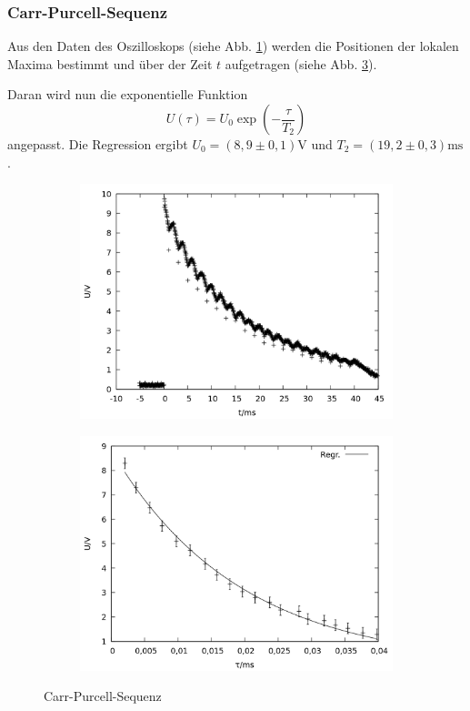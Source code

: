 \subsubsection{Carr-Purcell-Sequenz}
Aus den Daten des Oszilloskops (siehe Abb. \ref{fig:carr_raw}) werden die Positionen der lokalen Maxima bestimmt und über der Zeit $t$ aufgetragen (siehe Abb. \ref{fig:carr}).

Daran wird nun die exponentielle Funktion $$U(\tau) = U_0\exp{\left(-\frac{\tau}{T_2}\right)}$$ angepasst. Die Regression ergibt $U_0 = (8,9\pm 0,1)\si{\volt}$ und $T_2 = (19,2\pm 0,3) \si{\milli\second}$.\\

\begin{figure}[h]
  \begin{subfigure}[h]{0.5\textwidth}
    \centering
    \includegraphics[width=\linewidth]{data/p402_443_data/carr_purcell_sequenz/plot_156.png}
    \label{fig:carr_raw}
  \end{subfigure}%
  \begin{subfigure}[h]{0.5\textwidth}
    \centering
    \includegraphics[width=\linewidth]{data/p402_443_data/carr_purcell_sequenz/out_carr.png}
    \label{fig:carr}
  \end{subfigure}
  \caption{Carr-Purcell-Sequenz}
\end{figure}

